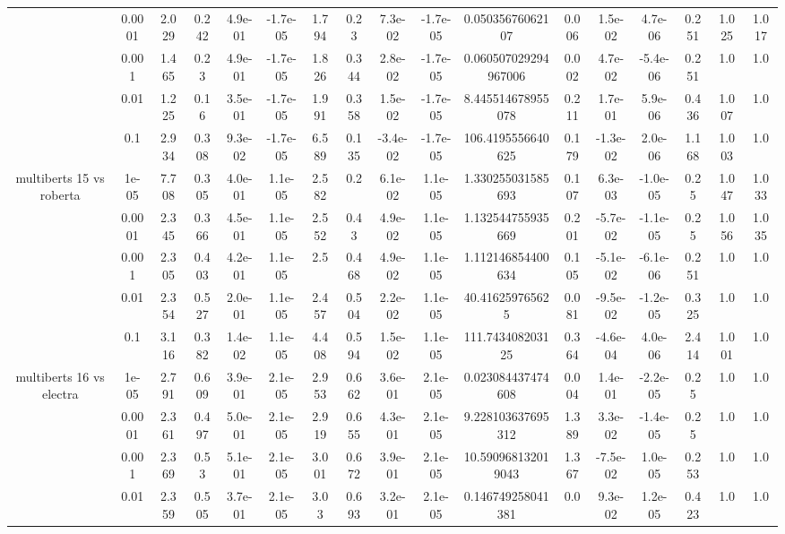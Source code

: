 \begin{tabular}{|c|c|c|c|c|c|c|c|c|c|c|c|c|c|c|c|c|}
 & 0.0001 & 2.029 & 0.242 & 4.9e-01 & -1.7e-05 & 1.794 & 0.23 & 7.3e-02 & -1.7e-05 & 0.05035676062107 & 0.006 & 1.5e-02 & 4.7e-06 & 0.251 & 1.025 & 1.017 \\
 & 0.001 & 1.465 & 0.23 & 4.9e-01 & -1.7e-05 & 1.826 & 0.344 & 2.8e-02 & -1.7e-05 & 0.060507029294967006 & 0.002 & 4.7e-02 & -5.4e-06 & 0.251 & 1.0 & 1.0 \\
 & 0.01 & 1.225 & 0.16 & 3.5e-01 & -1.7e-05 & 1.991 & 0.358 & 1.5e-02 & -1.7e-05 & 8.445514678955078 & 0.211 & 1.7e-01 & 5.9e-06 & 0.436 & 1.007 & 1.0 \\
 & 0.1 & 2.934 & 0.308 & 9.3e-02 & -1.7e-05 & 6.589 & 0.135 & -3.4e-02 & -1.7e-05 & 106.4195556640625 & 0.179 & -1.3e-02 & 2.0e-06 & 1.168 & 1.003 & 1.0 \\
\hline
\multirow{5}{*}{multiberts 15 vs roberta } & 1e-05 & 7.708 & 0.305 & 4.0e-01 & 1.1e-05 & 2.582 & 0.2 & 6.1e-02 & 1.1e-05 & 1.330255031585693 & 0.107 & 6.3e-03 & -1.0e-05 & 0.25 & 1.047 & 1.033 \\
 & 0.0001 & 2.345 & 0.366 & 4.5e-01 & 1.1e-05 & 2.552 & 0.43 & 4.9e-02 & 1.1e-05 & 1.132544755935669 & 0.201 & -5.7e-02 & -1.1e-05 & 0.25 & 1.056 & 1.035 \\
 & 0.001 & 2.305 & 0.403 & 4.2e-01 & 1.1e-05 & 2.5 & 0.468 & 4.9e-02 & 1.1e-05 & 1.112146854400634 & 0.105 & -5.1e-02 & -6.1e-06 & 0.251 & 1.0 & 1.0 \\
 & 0.01 & 2.354 & 0.527 & 2.0e-01 & 1.1e-05 & 2.457 & 0.504 & 2.2e-02 & 1.1e-05 & 40.416259765625 & 0.081 & -9.5e-02 & -1.2e-05 & 0.325 & 1.0 & 1.0 \\
 & 0.1 & 3.116 & 0.382 & 1.4e-02 & 1.1e-05 & 4.408 & 0.594 & 1.5e-02 & 1.1e-05 & 111.743408203125 & 0.364 & -4.6e-04 & 4.0e-06 & 2.414 & 1.001 & 1.0 \\
\hline
\multirow{5}{*}{multiberts 16 vs electra } & 1e-05 & 2.791 & 0.609 & 3.9e-01 & 2.1e-05 & 2.953 & 0.662 & 3.6e-01 & 2.1e-05 & 0.023084437474608 & 0.004 & 1.4e-01 & -2.2e-05 & 0.25 & 1.0 & 1.0 \\
 & 0.0001 & 2.361 & 0.497 & 5.0e-01 & 2.1e-05 & 2.919 & 0.655 & 4.3e-01 & 2.1e-05 & 9.228103637695312 & 1.389 & 3.3e-02 & -1.4e-05 & 0.25 & 1.0 & 1.0 \\
 & 0.001 & 2.369 & 0.53 & 5.1e-01 & 2.1e-05 & 3.001 & 0.672 & 3.9e-01 & 2.1e-05 & 10.590968132019043 & 1.367 & -7.5e-02 & 1.0e-05 & 0.253 & 1.0 & 1.0 \\
 & 0.01 & 2.359 & 0.505 & 3.7e-01 & 2.1e-05 & 3.03 & 0.693 & 3.2e-01 & 2.1e-05 & 0.146749258041381 & 0.0 & 9.3e-02 & 1.2e-05 & 0.423 & 1.0 & 1.0 \\

\end{tabular}

